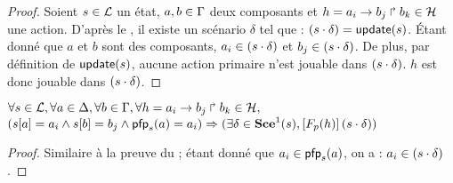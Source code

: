\begin{proof} %
  Soient $s \in \mathcal{L}$ un état, $a,b \in \Gamma$ deux composants et
  $h = a_i\rightarrow b_j\Rsh b_k \in \mathcal{H}$ une action.
  D'après le , il existe un scénario $\delta$ tel que :
  $(s \cdot \delta) = \mathsf{update}(s)$.
  Étant donné que $a$ et $b$ sont des composants,
  $a_i \in (s \cdot \delta)$ et $b_j \in (s \cdot \delta)$.
  De plus, par définition de $\mathsf{update}(s)$, aucune action primaire n'est jouable
  dans $(s \cdot \delta)$.
  $h$ est donc jouable dans $(s \cdot \delta)$.
\end{proof}

\begin{lemma}
  $\forall s \in \mathcal{L}, \forall a \in \Delta, \forall b \in \Gamma,
    \forall h = a_i\rightarrow b_j\Rsh b_k \in \mathcal{H},$\\
  $({s[a]} = a_i \wedge {s[b]} = b_j \wedge \mathsf{pfp}_s(a) = a_i) \Rightarrow
    (\exists \delta \in \mathbf{Sce}^1(s),
    \left[F_{p}(h)\right](s \cdot \delta))$
\end{lemma}

\begin{proof} %
  Similaire à la preuve du  ;
  étant donné que $a_i \in \mathsf{pfp}_s(a)$, on a : $a_i \in (s \cdot \delta)$.
\end{proof}

